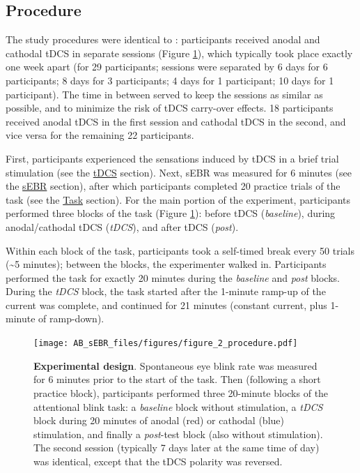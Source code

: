 \documentclass[11pt,english,]{memoir}
\begin{document}
\hypertarget{AB_sEBR-procedure}{%
\subsection{Procedure}\label{AB_sEBR-procedure}}

The study procedures were identical to \textcite{London2015}: participants received anodal and cathodal tDCS in separate sessions (Figure \ref{fig:AB-sEBR-fig-procedure}), which typically took place exactly one week apart (for 29 participants; sessions were separated by 6 days for 6 participants; 8 days for 3 participants; 4 days for 1 participant; 10 days for 1 participant). The time in between served to keep the sessions as similar as possible, and to minimize the risk of tDCS carry-over effects. 18 participants received anodal tDCS in the first session and cathodal tDCS in the second, and vice versa for the remaining 22 participants.

First, participants experienced the sensations induced by tDCS in a brief trial stimulation (see the \protect\hyperlink{AB_sEBR-tDCS}{tDCS} section). Next, sEBR was measured for 6 minutes (see the \protect\hyperlink{AB_sEBR-sEBR}{sEBR} section), after which participants completed 20 practice trials of the task (see the \protect\hyperlink{AB_sEBR-task}{Task} section). For the main portion of the experiment, participants performed three blocks of the task (Figure \ref{fig:AB-sEBR-fig-procedure}): before tDCS (\emph{baseline}), during anodal/cathodal tDCS (\emph{tDCS}), and after tDCS (\emph{post}).

Within each block of the task, participants took a self-timed break every 50 trials (\textasciitilde{}5 minutes); between the blocks, the experimenter walked in. Participants performed the task for exactly 20 minutes during the \emph{baseline} and \emph{post} blocks. During the \emph{tDCS} block, the task started after the 1-minute ramp-up of the current was complete, and continued for 21 minutes (constant current, plus 1-minute of ramp-down).

\begin{figure}
\centering
\texttt{[image: AB\_sEBR\_files/figures/figure\_2\_procedure.pdf]}
\caption{\label{fig:AB-sEBR-fig-procedure}\textbf{Experimental design}. Spontaneous eye blink rate was measured for 6 minutes prior to the start of the task. Then (following a short practice block), participants performed three 20-minute blocks of the attentional blink task: a \emph{baseline} block without stimulation, a \emph{tDCS} block during 20 minutes of anodal (red) or cathodal (blue) stimulation, and finally a \emph{post}-test block (also without stimulation). The second session (typically 7 days later at the same time of day) was identical, except that the tDCS polarity was reversed.}
\end{figure}
\end{document}
